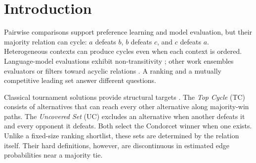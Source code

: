 \begin{abstract}
Soft Tournament Equilibrium (STE) is a differentiable layer for Top-Cycle (TC) and Uncovered-Set (UC) inference from reciprocal pair probabilities. Normalized log-sum-exp reachability and covering give smooth scores with approximation, perturbation, and margin-recovery bounds. We distinguish structural supervision, posterior uncertainty, and the final set decision through controlled synthetic studies and reconstruction of recorded ordinal profiles. Matched-epoch training improves F1 under a common structural readout, but a separate equal-budget soft-UC comparison does not demonstrate an advantage. A prospective equal-budget hard-UC study improves selective F1 at 24 alternatives from 0.6327/0.6292 for ordinary/relational native heads to 0.6676, while exact recovery remains only 1.16\%. On 36 human profiles held out by source, a separate exploratory comparison favors Jeffreys posterior inference over learned independent-edge and mixture distributions in native expected-F1 decoding (0.8742 versus 0.8704/0.8366). Only three references are non-singleton selective cores. Completion certificates and full-depth TC diagnostics clarify additional identification, smoothing, and computational limits. The evidence supports conditional synthetic overlap gains, while preserving the soft-set null and the absence of a demonstrated learning advantage over strong count-based human-profile controls.
\end{abstract}

\section{Introduction}\label{sec:intro}
Pairwise comparisons support preference learning and model evaluation, but their majority relation can cycle: $a$ defeats $b$, $b$ defeats $c$, and $c$ defeats $a$. Heterogeneous contexts can produce cycles even when each context is ordered. Language-model evaluations exhibit non-transitivity \citep{xu2025nontransitivity}; other work ensembles evaluators or filters toward acyclic relations \citep{hu2026acyclic,yu2025elspr}. A ranking and a mutually competitive leading set answer different questions.

Classical tournament solutions provide structural targets \citep{brandt2016handbook,laslier1997tournament}. The \emph{Top Cycle} (TC) consists of alternatives that can reach every other alternative along majority-win paths. The \emph{Uncovered Set} (UC) excludes an alternative when another defeats it and every opponent it defeats. Both select the Condorcet winner when one exists. Unlike a fixed-size ranking shortlist, these sets are determined by the relation itself. Their hard definitions, however, are discontinuous in estimated edge probabilities near a majority tie.

